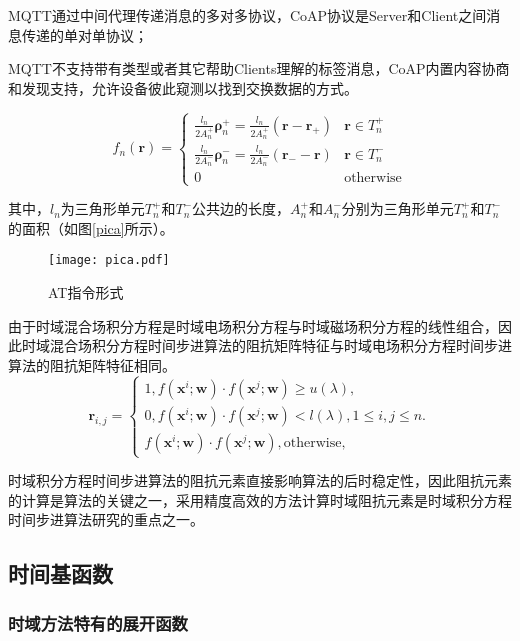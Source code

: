   MQTT通过中间代理传递消息的多对多协议，CoAP协议是Server和Client之间消息传递的单对单协议；
  
  MQTT不支持带有类型或者其它帮助Clients理解的标签消息，CoAP内置内容协商和发现支持，允许设备彼此窥测以找到交换数据的方式。

\begin{equation}
f_n(\bm{r})=
\begin{cases}
\frac{l_n}{2A_n^+}\bm{\rho}_n^+=\frac{l_n}{2A_n^+}(\bm{r}-\bm{r}_+)&\bm{r}\in T_n^+\\
\frac{l_n}{2A_n^-}\bm{\rho}_n^-=\frac{l_n}{2A_n^-}(\bm{r}_--\bm{r})&\bm{r}\in T_n^-\\
0&\text{otherwise}
\end{cases}
\end{equation}

其中，$l_n$为三角形单元$T_n^+$和$T_n^-$公共边的长度，$A_n^+$和$A_n^-$分别为三角形单元$T_n^+$和$T_n^-$的面积（如图\ref{pica}所示）。

\begin{figure}[h]
	\texttt{[image: pica.pdf]}
	\caption{AT指令形式}
	\label{p}
\end{figure}

由于时域混合场积分方程是时域电场积分方程与时域磁场积分方程的线性组合，因此时域混合场积分方程时间步进算法的阻抗矩阵特征与时域电场积分方程时间步进算法的阻抗矩阵特征相同。
\begin{equation}
\label{latent_binary_variable}
\bm{r}_{i,j}=
\begin{cases}
1,f(\bm{x}^{i};\bm{w})\cdot f(\bm{x}^{j};\bm{w})\geq u(\lambda),\\
0,f(\bm{x}^{i};\bm{w})\cdot f(\bm{x}^{j};\bm{w})< l(\lambda), 1\leq i,j\leq n.\\
f(\bm{x}^{i};\bm{w})\cdot f(\bm{x}^{j};\bm{w}),\text{otherwise},
\end{cases}
\end{equation}

时域积分方程时间步进算法的阻抗元素直接影响算法的后时稳定性，因此阻抗元素的计算是算法的关键之一，采用精度高效的方法计算时域阻抗元素是时域积分方程时间步进算法研究的重点之一。


\subsection{时间基函数}

\subsubsection{时域方法特有的展开函数}

